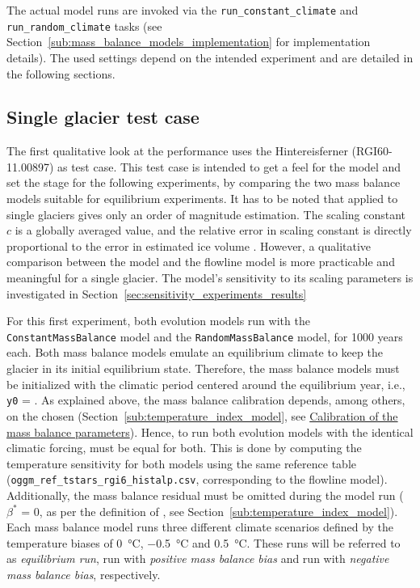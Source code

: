     The actual model runs are invoked via the \lstinline`run_constant_climate` and \lstinline`run_random_climate` tasks (see Section~\ref{sub:mass_balance_models_implementation} for implementation details). The used settings depend on the intended experiment and are detailed in the following sections.

    \subsection{Single glacier test case} %
    \label{sub:single_glacier_test_case_setup}

        The first qualitative look at the \vas{} performance uses the Hintereisferner (RGI60-11.00897) as test case. This test case is intended to get a feel for the \vas{} model and set the stage for the following experiments, by comparing the two mass balance models suitable for equilibrium experiments.
        It has to be noted that \vas{} applied to single glaciers gives only an order of magnitude estimation. The scaling constant $c$ is a globally averaged value, and the relative error in scaling constant is directly proportional to the error in estimated ice volume \citep{Bahr2015}. However, a qualitative comparison between the \vas{} model and the flowline model is more practicable and meaningful for a single glacier. The model's sensitivity to its scaling parameters is investigated in Section~\ref{sec:sensitivity_experiments_results}

        For this first experiment, both evolution models run with the \lstinline`ConstantMassBalance` model and the \lstinline`RandomMassBalance` model, for 1000 years each. Both mass balance models emulate an equilibrium climate to keep the glacier in its initial equilibrium state. Therefore, the mass balance models must be initialized with the climatic period centered around the equilibrium year, i.e., \lstinline`y0` = \tstar{}. As explained above, the mass balance calibration depends, among others, on the chosen \tstar{} (Section~\ref{sub:temperature_index_model}, see \hyperref[ssub:mb_calib]{Calibration of the mass balance parameters}). Hence, to run both evolution models with the identical climatic forcing, \tstar{} must be equal for both. This is done by computing the temperature sensitivity \mustar{} for both models using the same \tstar{} reference table (\lstinline`oggm_ref_tstars_rgi6_histalp.csv`, corresponding to the flowline model). Additionally, the mass balance residual must be omitted during the model run ($\beta^*$ = 0, as per the definition of \mustar{}, see Section~\ref{sub:temperature_index_model}). Each mass balance model runs three different climate scenarios defined by the temperature biases of \SI{0}{\celsius}, \SI{-0.5}{\celsius} and \SI{+0.5}{\celsius}. These runs will be referred to as \emph{equilibrium run}, run with \emph{positive mass balance bias} and run with \emph{negative mass balance bias}, respectively.
    
